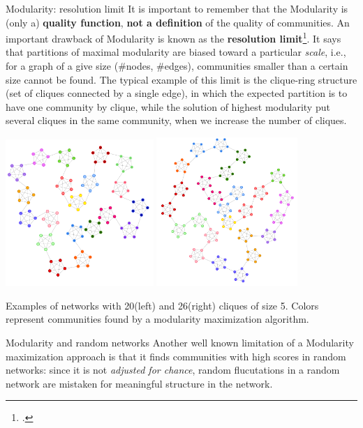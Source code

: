 \documentclass[a4paper,11pt]{book}
\begin{document}
\begin{textbox}{Modularity: resolution limit}
It is important to remember that the Modularity is (only a) \textbf{quality function}, \textbf{not a definition} of the quality of communities. An important drawback of Modularity is known as the \textbf{resolution limit}\footcite{fortunato2007resolution}. It says that partitions of maximal modularity are biased toward a particular \textit{scale}, i.e., for a graph of a give size (\#nodes, \#edges), communities smaller than a certain size cannot be found. The typical example of this limit is the clique-ring structure (set of cliques connected by a single edge), in which the expected partition is to have one community by clique, while the solution of highest modularity put several cliques in the same community, when we increase the number of cliques.

\centering
\includegraphics[width=0.42\textwidth]{pics/cliqueRing20.png}
\includegraphics[width=0.4\textwidth]{pics/cliqueRing26.png}

Examples of networks with 20(left) and 26(right) cliques of size 5. Colors represent communities found by a modularity maximization algorithm.
\end{textbox}

\begin{textbox}{Modularity and random networks}
Another well known limitation of a Modularity maximization approach is that it finds communities with high scores in random networks: since it is not \textit{adjusted for chance}, random flucutations in a random network are mistaken for meaningful structure in the network.
\end{textbox}
\end{document}
